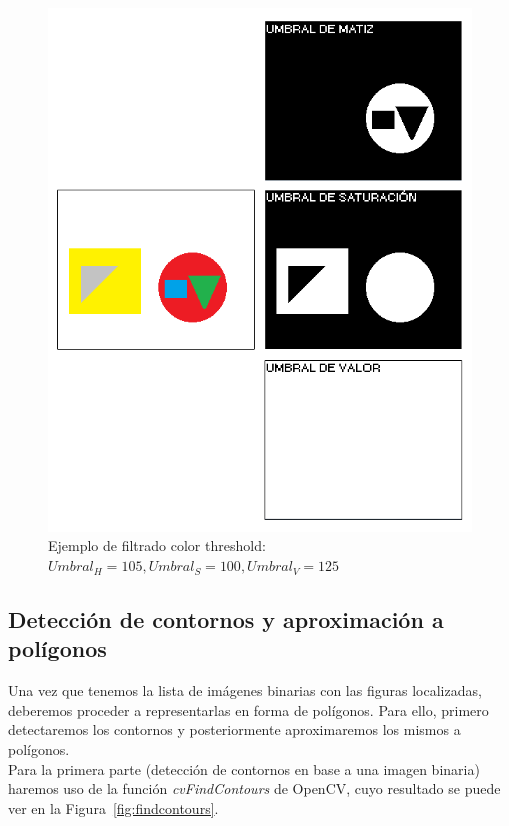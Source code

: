 {		\begin{figure}[htbp]
		\centering
		\includegraphics[scale=0.47]{graphics/colorthreshold2.png}
		\caption{Ejemplo de filtrado color threshold: $Umbral_{H} = 105, Umbral_{S} = 100, Umbral_{V} = 125$}
		\label{fig:colorthres2}
		\end{figure}
	
	
	
	\subsection{Detección de contornos y aproximación a polígonos}
	\label{sec:deteccionContornos}
	
	Una vez que tenemos la lista de imágenes binarias con las figuras localizadas, deberemos proceder a representarlas en forma de polígonos. Para ello, primero detectaremos los contornos y posteriormente aproximaremos los mismos a polígonos.\\
	
	Para la primera parte (detección de contornos en base a una imagen binaria) haremos uso de la función \emph{cvFindContours} de OpenCV, cuyo resultado se puede ver en la Figura~\ref{fig:findcontours}.\\
	
}
